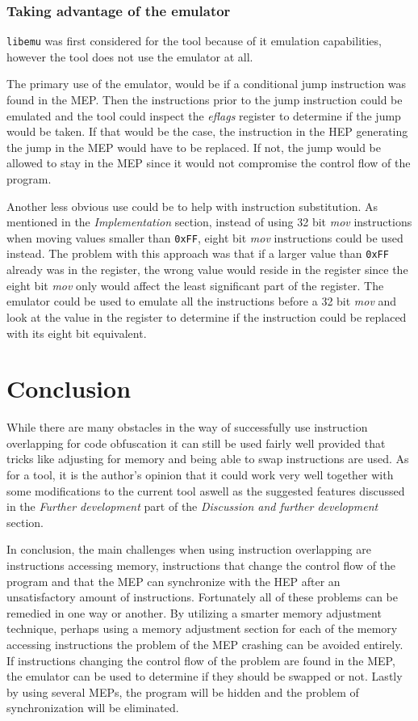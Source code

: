 \documentclass[11pt,twoside]{eitExjobb}
\begin{document}
\subsection{Taking advantage of the emulator}
\texttt{libemu} was first considered for the tool because of it emulation capabilities, however the tool does not use the emulator at all. 

The primary use of the emulator, would be if a conditional jump instruction was found in the MEP. Then the instructions prior to the jump instruction could be emulated and the tool could inspect the \emph{eflags} register to determine if the jump would be taken. If that would be the case, the instruction in the HEP generating the jump in the MEP would have to be replaced. If not, the jump would be allowed to stay in the MEP since it would not compromise the control flow of the program.

Another less obvious use could be to help with instruction substitution. As mentioned in the \emph{Implementation} section, instead of using 32 bit \emph{mov} instructions when moving values smaller than \texttt{0xFF}, eight bit \emph{mov} instructions could be used instead. The problem with this approach was that if a larger value than \texttt{0xFF} already was in the register, the wrong value would reside in the register since the eight bit \emph{mov} only would affect the least significant part of the register. The emulator could be used to emulate all the instructions before a 32 bit \emph{mov} and look at the value in the register to determine if the instruction could be replaced with its eight bit equivalent.

\chapter{Conclusion}
While there are many obstacles in the way of successfully use instruction overlapping for code obfuscation it can still be used fairly well provided that tricks like adjusting for memory and being able to swap instructions are used. As for a tool, it is the author's opinion that it could work very well together with some modifications to the current tool aswell as the suggested features discussed in the \emph{Further development} part of the \emph{Discussion and further development} section.

In conclusion, the main challenges when using instruction overlapping are instructions accessing memory, instructions that change the control flow of the program and that the MEP can synchronize with the HEP after an unsatisfactory amount of instructions. Fortunately all of these problems can be remedied in one way or another. By utilizing a smarter memory adjustment technique, perhaps using a memory adjustment section for each of the memory accessing instructions the problem of the MEP crashing can be avoided entirely. If instructions changing the control flow of the problem are found in the MEP, the emulator can be used to determine if they should be swapped or not. Lastly by using several MEPs, the program will be hidden and the problem of synchronization will be eliminated. 



{}


\end{document}
